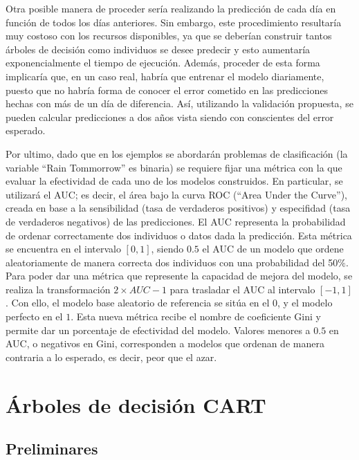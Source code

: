 \documentclass[12pt,twoside]{article}
\begin{document}
Otra posible manera de proceder sería realizando la predicción de cada día en función de todos los días anteriores. Sin embargo, este procedimiento resultaría muy costoso con los recursos disponibles, ya que se deberían construir tantos árboles de decisión como individuos se desee predecir y esto aumentaría exponencialmente el tiempo de ejecución. Además, proceder de esta forma implicaría que, en un caso real, habría que entrenar el modelo diariamente, puesto que no habría forma de conocer el error cometido en las predicciones hechas con más de un día de diferencia. Así, utilizando la validación propuesta, se pueden calcular predicciones a dos años vista siendo con conscientes del error esperado.

Por ultimo, dado que en los ejemplos se abordarán problemas de clasificación (la variable ``Rain Tommorrow'' es binaria) se requiere fijar una métrica con la que evaluar la efectividad de cada uno de los modelos construidos. En particular, se utilizará el AUC; es decir, el área bajo la curva ROC (``Area Under the Curve''), creada en base a la sensibilidad (tasa de  verdaderos positivos) y especifidad (tasa de verdaderos negativos) de las predicciones. El AUC representa la probabilidad de ordenar correctamente dos individuos o datos dada la predicción. Esta métrica se encuentra en el intervalo $[0, 1]$, siendo $0.5$ el AUC de un modelo que ordene aleatoriamente de manera correcta dos individuos con una probabilidad del 50$\%$. Para poder dar una métrica que represente la capacidad de mejora del modelo, se realiza la transformación $2\times AUC -1$ para trasladar el AUC al intervalo $[-1, 1]$. Con ello, el modelo base aleatorio de referencia se sitúa en el $0$, y el modelo perfecto en el $1$. Esta nueva métrica recibe el nombre de coeficiente Gini y permite dar un porcentaje de efectividad del modelo. Valores menores a $0.5$ en AUC, o negativos en Gini, corresponden a modelos que ordenan de manera contraria a lo esperado, es decir, peor que el azar.







\newpage
\section{Árboles de decisión CART}
\subsection{Preliminares}
\end{document}
